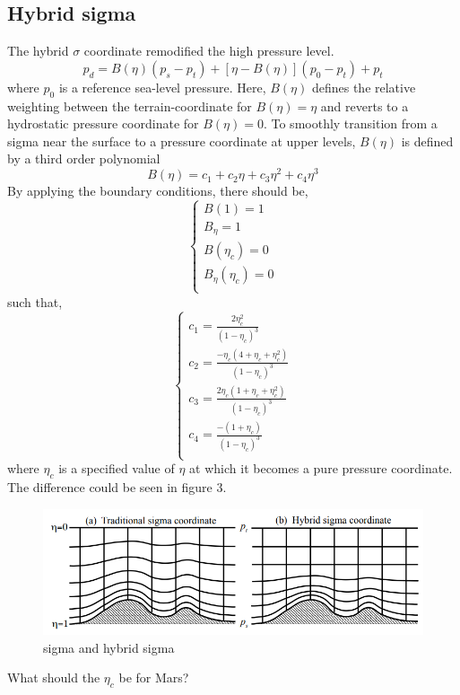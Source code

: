 \documentclass{article}
\begin{document}
\subsection{Hybrid sigma}
The hybrid $\sigma$ coordinate remodified the high pressure level. 
\begin{equation}
    p_d=B(\eta)(p_s-p_t)+[\eta-B(\eta)](p_0-p_t)+p_t
\end{equation}
where $p_0$ is a reference sea-level pressure. Here, $B(\eta)$ defines the relative weighting between the terrain-coordinate for $B(\eta)=\eta$ and
reverts to a hydrostatic pressure coordinate for $B(\eta)=0$. To smoothly transition from a sigma near the surface to a pressure coordinate at upper levels,
$B(\eta)$ is defined by a third order polynomial \newline
\begin{equation}
    B(\eta)=c_1+c_2\eta+c_3\eta^{2}+c_4\eta^{3}
\end{equation}
By applying the boundary conditions, there should be,
\begin{equation}
    \begin{cases}
        B(1)=1\\
        B_{\eta}=1\\
        B(\eta_c)=0\\
        B_{\eta}(\eta_c)=0\\
    \end{cases}
\end{equation}
such that,
\begin{equation}
    \begin{cases}
        c_1=\frac{2\eta_c^2}{(1-\eta_c)^3}\\
        c_2=\frac{-\eta_c(4+\eta_c+\eta_c^2)}{(1-\eta_c)^3}\\
        c_3=\frac{2\eta_c(1+\eta_c+\eta_c^2)}{(1-\eta_c)^3}\\
        c_4=\frac{-(1+\eta_c)}{(1-\eta_c)^3}\\        
    \end{cases}
\end{equation}
where $\eta_c$ is a specified value of $\eta$ at which it becomes a pure pressure coordinate.
The difference could be seen in figure 3.
\begin{figure}
    \centering
    \includegraphics[scale=0.45]{./imgs/wiki/hybridsigma.png}
    \caption{sigma and hybrid sigma}     
    \label{fig:3}
\end{figure}
What should the $\eta_c$ be for Mars?
\end{document}
